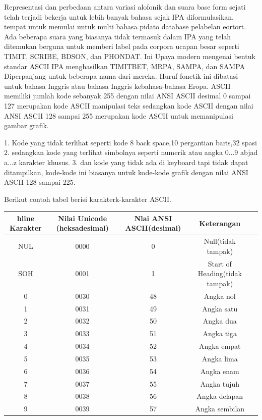 	Representasi dan perbedaan antara variasi alofonik dan suara base form sejati telah terjadi
	bekerja untuk lebih banyak bahasa sejak IPA diformulasikan. 
	tempat untuk memulai untuk multi bahasa pidato database pelabelan eortort.
	Ada beberapa suara yang biasanya tidak termasuk dalam IPA yang telah ditemukan
	berguna untuk memberi label pada corpora ucapan besar seperti TIMIT, SCRIBE, BDSON, dan PHONDAT. Ini
	Upaya modern mengenai bentuk standar ASCII IPA menghasilkan TIMITBET, MRPA, SAMPA, dan
	SAMPA Diperpanjang untuk beberapa nama dari mereka. Huruf fonetik ini dibatasi untuk bahasa Inggris atau bahasa Inggris kebahasa-bahasa Eropa.
	ASCII memiliki jumlah kode sebanyak 255 dengan nilai ANSI ASCII desimal 0 sampai 127 merupakan kode ASCII manipulasi teks sedangkan kode ASCII dengan nilai ANSI ASCII 128 sampai 255 merupakan kode ASCII untuk memanipulasi gambar grafik.
	
		1. Kode yang tidak terlihat seperti kode 8 back space,10 pergantian baris,32 spasi 
		2. sedangkan kode yang terlihat simbolnya seperti numerik atau angka 0...9 abjad a...z karakter khusus.
		3. dan kode yang tidak ada di keyboard tapi tidak dapat ditampilkan, kode-kode ini biasanya untuk kode-kode grafik dengan nilai ANSI ASCII 128 sampai 225.
  

	Berikut contoh tabel berisi karakterk-karakter ASCII.
\begin{table}[H]
\begin{tabular}{|c|c|c|c|c|}
hline
Karakter & Nilai Unicode (heksadesimal) & Nlai ANSI ASCII(desimal) & Keterangan\\
\hline
NUL & 0000 & 0 & Null(tidak tampak)\\
SOH & 0001 & 1 & Start of Heading(tidak tampak)\\
0 & 0030 & 48 & Angka nol\\
1 & 0031 & 49 & Angka satu\\
2 & 0032 & 50 & Angka dua\\
3 & 0033 & 51 & Angka tiga\\
4 & 0034 & 52 & Angka empat\\
5 & 0035 & 53 & Angka lima\\
6 & 0036 & 54 & Angka enam\\
7 & 0037 & 55 & Angka tujuh\\
8 & 0038 & 56 & Angka delapan\\
9 & 0039 & 57 & Angka sembilan\\
\hline
\end{tabular}
\end{table}

